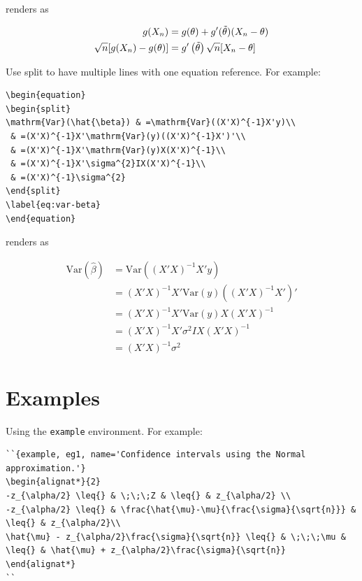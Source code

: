 \documentclass[
  british,
  oneside]{krantz}
\theoremstyle{definition}
\theoremstyle{definition}
\theoremstyle{definition}
\theoremstyle{definition}
\theoremstyle{remark}
\begin{document}
renders as

\begin{align} 
g(X_{n}) & = g(\theta)+g'({\tilde{\theta}})(X_{n}-\theta) \notag \\
\sqrt{n}[g(X_{n})-g(\theta)] & = g'\left({\tilde{\theta}}\right) 
\sqrt{n}[X_{n}-\theta]\label{eq:align} \\
\end{align}

Use split to have multiple lines with one equation reference. For example:

\begin{verbatim}
\begin{equation} 
\begin{split}
\mathrm{Var}(\hat{\beta}) & =\mathrm{Var}((X'X)^{-1}X'y)\\
 & =(X'X)^{-1}X'\mathrm{Var}(y)((X'X)^{-1}X')'\\
 & =(X'X)^{-1}X'\mathrm{Var}(y)X(X'X)^{-1}\\
 & =(X'X)^{-1}X'\sigma^{2}IX(X'X)^{-1}\\
 & =(X'X)^{-1}\sigma^{2}
\end{split}
\label{eq:var-beta}
\end{equation} 
\end{verbatim}

renders as

\begin{equation} 
\begin{split}
\mathrm{Var}(\hat{\beta}) & =\mathrm{Var}((X'X)^{-1}X'y)\\
 & =(X'X)^{-1}X'\mathrm{Var}(y)((X'X)^{-1}X')'\\
 & =(X'X)^{-1}X'\mathrm{Var}(y)X(X'X)^{-1}\\
 & =(X'X)^{-1}X'\sigma^{2}IX(X'X)^{-1}\\
 & =(X'X)^{-1}\sigma^{2}
\end{split}
\label{eq:var-beta}
\end{equation}

\hypertarget{examples}{%
\section{Examples}\label{examples}}

Using the \texttt{example} environment. For example: 

\begin{verbatim}
``{example, eg1, name='Confidence intervals using the Normal approximation.'}
\begin{alignat*}{2}
-z_{\alpha/2} \leq{} & \;\;\;Z & \leq{} & z_{\alpha/2} \\
-z_{\alpha/2} \leq{} & \frac{\hat{\mu}-\mu}{\frac{\sigma}{\sqrt{n}}} & \leq{} & z_{\alpha/2}\\
\hat{\mu} - z_{\alpha/2}\frac{\sigma}{\sqrt{n}} \leq{} & \;\;\;\mu & \leq{} & \hat{\mu} + z_{\alpha/2}\frac{\sigma}{\sqrt{n}}
\end{alignat*}
``
\end{verbatim}
\end{document}
